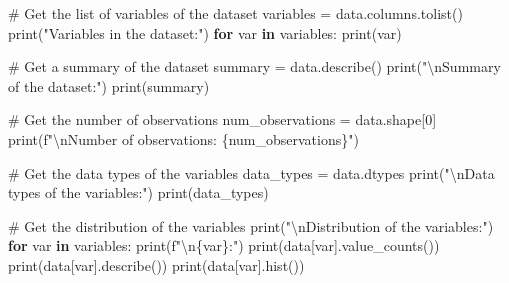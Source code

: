 \documentclass[
  11pt,
  letterpaper,
  DIV=11,
  numbers=noendperiod]{scrartcl}
\newenvironment{Shaded}{\begin{snugshade}}{\end{snugshade}}
\newcommand{\BuiltInTok}[1]{\textcolor[rgb]{0.00,0.23,0.31}{#1}}
\newcommand{\CharTok}[1]{\textcolor[rgb]{0.13,0.47,0.30}{#1}}
\newcommand{\CommentTok}[1]{\textcolor[rgb]{0.37,0.37,0.37}{#1}}
\newcommand{\ControlFlowTok}[1]{\textcolor[rgb]{0.00,0.23,0.31}{\textbf{#1}}}
\newcommand{\DecValTok}[1]{\textcolor[rgb]{0.68,0.00,0.00}{#1}}
\newcommand{\KeywordTok}[1]{\textcolor[rgb]{0.00,0.23,0.31}{\textbf{#1}}}
\newcommand{\NormalTok}[1]{\textcolor[rgb]{0.00,0.23,0.31}{#1}}
\newcommand{\OperatorTok}[1]{\textcolor[rgb]{0.37,0.37,0.37}{#1}}
\newcommand{\SpecialCharTok}[1]{\textcolor[rgb]{0.37,0.37,0.37}{#1}}
\newcommand{\SpecialStringTok}[1]{\textcolor[rgb]{0.13,0.47,0.30}{#1}}
\newcommand{\StringTok}[1]{\textcolor[rgb]{0.13,0.47,0.30}{#1}}
\begin{document}
\begin{Shaded}
\begin{Highlighting}[]
\CommentTok{\# Get the list of variables of the dataset}
\NormalTok{variables }\OperatorTok{=}\NormalTok{ data.columns.tolist()}
\BuiltInTok{print}\NormalTok{(}\StringTok{"Variables in the dataset:"}\NormalTok{)}
\ControlFlowTok{for}\NormalTok{ var }\KeywordTok{in}\NormalTok{ variables:}
    \BuiltInTok{print}\NormalTok{(var)}

\CommentTok{\# Get a summary of the dataset}
\NormalTok{summary }\OperatorTok{=}\NormalTok{ data.describe()}
\BuiltInTok{print}\NormalTok{(}\StringTok{"}\CharTok{\textbackslash{}n}\StringTok{Summary of the dataset:"}\NormalTok{)}
\BuiltInTok{print}\NormalTok{(summary)}

\CommentTok{\# Get the number of observations}
\NormalTok{num\_observations }\OperatorTok{=}\NormalTok{ data.shape[}\DecValTok{0}\NormalTok{]}
\BuiltInTok{print}\NormalTok{(}\SpecialStringTok{f"}\CharTok{\textbackslash{}n}\SpecialStringTok{Number of observations: }\SpecialCharTok{\{}\NormalTok{num\_observations}\SpecialCharTok{\}}\SpecialStringTok{"}\NormalTok{)}

\CommentTok{\# Get the data types of the variables}
\NormalTok{data\_types }\OperatorTok{=}\NormalTok{ data.dtypes}
\BuiltInTok{print}\NormalTok{(}\StringTok{"}\CharTok{\textbackslash{}n}\StringTok{Data types of the variables:"}\NormalTok{)}
\BuiltInTok{print}\NormalTok{(data\_types)}

\CommentTok{\# Get the distribution of the variables}
\BuiltInTok{print}\NormalTok{(}\StringTok{"}\CharTok{\textbackslash{}n}\StringTok{Distribution of the variables:"}\NormalTok{)}
\ControlFlowTok{for}\NormalTok{ var }\KeywordTok{in}\NormalTok{ variables:}
    \BuiltInTok{print}\NormalTok{(}\SpecialStringTok{f"}\CharTok{\textbackslash{}n}\SpecialCharTok{\{}\NormalTok{var}\SpecialCharTok{\}}\SpecialStringTok{:"}\NormalTok{)}
    \BuiltInTok{print}\NormalTok{(data[var].value\_counts())}
    \BuiltInTok{print}\NormalTok{(data[var].describe())}
    \BuiltInTok{print}\NormalTok{(data[var].hist())}
\end{Highlighting}
\end{Shaded}
\end{document}
